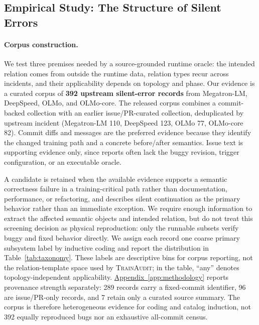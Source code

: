 \documentclass[sigconf,nonacm]{acmart}
\newcommand{\suppappendix}[1]{%
  \href{https://github.com/vivia-an/trainaudit-vldb-artifact/blob/vldb-2027-artifact-v1.0.1/paper/appendix_supplement.pdf}%
  {Appendix~\ref*{#1}}}
\begin{document}
\subsection{Empirical Study: The Structure of Silent Errors}
\label{subsec:bug-survey}
\label{subsec:bug-collection}
\label{subsec:fault-taxonomy}

\paragraph{Corpus construction.}
We test three premises needed by a source-grounded runtime oracle: the intended relation comes from outside the runtime data, relation types recur across incidents, and their applicability depends on topology and phase. Our evidence is a curated corpus of \textbf{392 upstream silent-error records} from Megatron-LM, DeepSpeed, OLMo, and OLMo-core. The released corpus combines a commit-backed collection with an
earlier issue/PR-curated collection, deduplicated by upstream incident
(Megatron-LM 110, DeepSpeed 123, OLMo 77, OLMo-core 82). Commit diffs and
messages are the preferred evidence because they identify the changed
training path and a concrete before/after semantics. Issue text is supporting evidence
only, since reports often lack the buggy revision, trigger configuration, or
an executable oracle.

A candidate is retained when the available evidence supports a semantic
correctness failure in a training-critical path rather than documentation,
performance, or refactoring, and describes silent continuation as the primary
behavior rather than an immediate exception. We require enough information to
extract the affected semantic objects and intended relation, but do not treat
this screening decision as physical reproduction: only the runnable subsets
verify buggy and fixed behavior directly. We assign each record one coarse
primary subsystem label by inductive coding and report the distribution in
Table~\ref{tab:taxonomy}. These labels
are descriptive bins for corpus reporting, not the relation-template space
used by \textsc{TrainAudit}; in the table, ``any'' denotes
topology-independent applicability.
\suppappendix{app:methodology} reports provenance strength separately: 289
records carry a fixed-commit identifier, 96 are issue/PR-only records, and 7
retain only a curated source summary. The corpus is therefore heterogeneous
evidence for coding and catalog induction, not 392 equally reproduced bugs
nor an exhaustive all-commit census.
\end{document}
